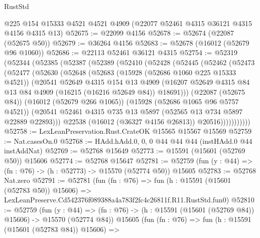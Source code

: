 \begin{lexlean}{RustStd}
\begin{coremodule}
    @225
    @154
    @15333
    @4521
    @4521
    @4909
    (@22077 @52461 @4315 @36121 @4315 @4156 @4315 @13)
@52675 := @22099 @4156
@52678 := @52674 (@22087 (@52675 @50))
@52679 := @36264 @4156
@52683 := @52678 (@16012 (@52679 @96 @1060))
@52686 := @22113 @52461 @36121 @4315
@52754 := @52319
    (@52344
      (@52385
        (@52387
          (@52389
            (@52410
              (@52428
                (@52445
                  (@52462
                    (@52473
                      (@52477
                        (@52630
                          (@52648
                            (@52683
                              (@15928 (@52686 @1060 @225 @15333 @4521))
                              (@20541
                                @52649
                                @4315
                                @154
                                @13
                                @4909
                                (@16207
                                  @52649
                                  @4315
                                  @84
                                  @13
                                  @84
                                  @4909
                                  (@16215 (@16216 @52649 @84))
                                  @18691)))
                            (@22087 (@52675 @84))
                            (@16012 (@52679 @266 @1065))
                            (@15928 (@52686 @1065 @96 @5757 @4521))
                            (@20541
                              @52461
                              @4315
                              @735
                              @13
                              @5897
                              (@52565 @13 @734 @5897 @22889 @22893)))
                          @22538
                          (@16012 (@36327 @4156 @26813))
                          @20516)))))))))))
@52758 := LexLeanPreservation.Rust.CrateOK @15565 @15567 @15569
@52759 := Nat.casesOn.{0}
@52768 := HAdd.hAdd.{0, 0, 0} @44 @44 @44 (instHAdd.{0} @44 instAddNat)
@52769 := @52768 @15649
@52773 := @15591 (@15601 (@52769 @50)) @15606
@52774 := @52768 @15647
@52781 := @52759 (fun (y : @44) => (fn : @76) -> (h : @52773) -> @15570 (@52774 @50)) @15605
@52783 := @52768 Nat.zero
@52791 := @52781
    (fun (fn : @76) =>
    fun (h : @15591 (@15601 (@52783 @50)) @15606) =>
    LexLeanPreserve.Cd542376f089388a4a783f2fc4c26811f.R11.RustStd.fun0)
@52810 := @52759
    (fun (y : @44) =>
    (fn : @76) -> (h : @15591 (@15601 (@52769 @84)) @15606) -> @15570 (@52774 @84))
    @15605
    (fun (fn : @76) =>
    fun (h : @15591 (@15601 (@52783 @84)) @15606) =>

\end{coremodule}
\end{lexlean}
